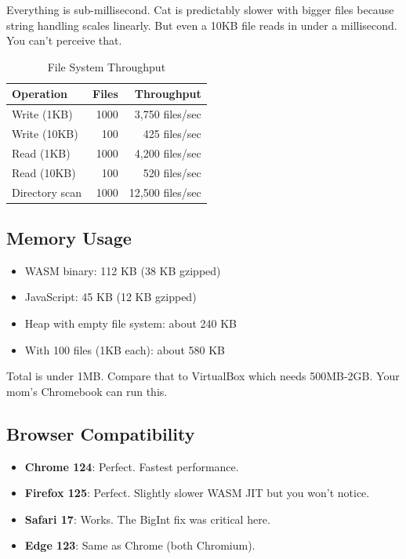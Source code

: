 \documentclass[conference]{IEEEtran}
\begin{document}
Everything is sub-millisecond. Cat is predictably slower with bigger files because string handling scales linearly. But even a 10KB file reads in under a millisecond. You can't perceive that.

\begin{table}[h]
\centering
\caption{File System Throughput}
\begin{tabular}{|l|r|r|}
\hline
\textbf{Operation} & \textbf{Files} & \textbf{Throughput} \\
\hline
Write (1KB) & 1000 & 3,750 files/sec \\
Write (10KB) & 100 & 425 files/sec \\
Read (1KB) & 1000 & 4,200 files/sec \\
Read (10KB) & 100 & 520 files/sec \\
Directory scan & 1000 & 12,500 files/sec \\
\hline
\end{tabular}
\end{table}

\subsection{Memory Usage}

\begin{itemize}
    \item WASM binary: 112 KB (38 KB gzipped)
    \item JavaScript: 45 KB (12 KB gzipped)
    \item Heap with empty file system: about 240 KB
    \item With 100 files (1KB each): about 580 KB
\end{itemize}

Total is under 1MB. Compare that to VirtualBox which needs 500MB-2GB. Your mom's Chromebook can run this.

\subsection{Browser Compatibility}

\begin{itemize}
    \item \textbf{Chrome 124}: Perfect. Fastest performance.
    \item \textbf{Firefox 125}: Perfect. Slightly slower WASM JIT but you won't notice.
    \item \textbf{Safari 17}: Works. The BigInt fix was critical here.
    \item \textbf{Edge 123}: Same as Chrome (both Chromium).
\end{itemize}
\end{document}
